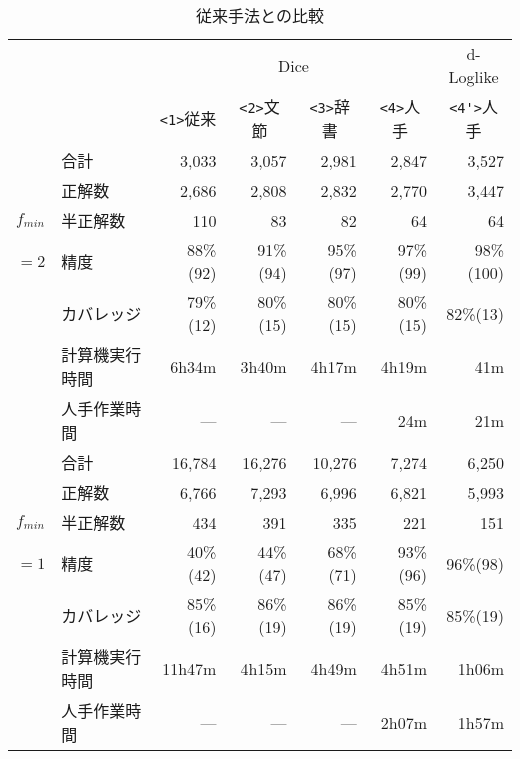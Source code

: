 \begin{table}[t]
\caption{従来手法との比較}
\label{従来手法}
\begin{center}
\begin{tabular}{l|l||r|r|r|r|r}
\hline
\multicolumn{2}{c||}{} 
& \multicolumn{4}{c|}{Dice} 
& \multicolumn{1}{c}{d-Loglike} \\\cline{3-7}
\multicolumn{2}{c||}{} 
& \multicolumn{1}{c|}{\verb|<1>|従来}
& \multicolumn{1}{c|}{\verb|<2>|文節}
& \multicolumn{1}{c|}{\verb|<3>|辞書}
& \multicolumn{1}{c|}{\verb|<4>|人手}
& \multicolumn{1}{c}{\verb|<4'>|人手} \\
\hline
          & 合計    & 3,033   & 3,057   & 2,981   & 2,847   & 3,527\\
          & 正解数  & 2,686   & 2,808   & 2,832   & 2,770   & 3,447\\
$f_{min}$ & 半正解数&   110   &    83   &    82   &    64   &    64\\\cline{2-7}
$=2$      & 精度    & 88\%(92)& 91\%(94)& 95\%(97)& 97\%(99)& 98\%(100) \\
         &カバレッジ& 79\%(12)& 80\%(15)& 80\%(15)& 80\%(15)& 82\%(13)  \\\cline{2-7}
     &計算機実行時間&   6h34m &  3h40m  & 4h17m   & 4h19m   & 41m       \\
       &人手作業時間&     --- &     --- &     --- &   24m   & 21m       \\ \hline

          & 合計    & 16,784  & 16,276  & 10,276  & 7,274   & 6,250     \\
          & 正解数  &  6,766  &  7,293  &  6,996  & 6,821   & 5,993     \\
$f_{min}$ & 半正解数&    434  &    391  &    335  &   221   &   151     \\ \cline{2-7}
$=1$      & 精度    & 40\%(42)& 44\%(47)& 68\%(71)& 93\%(96)&96\%(98)\\
         &カバレッジ& 85\%(16)& 86\%(19)& 86\%(19)& 85\%(19)&85\%(19)\\ \cline{2-7}
     &計算機実行時間&  11h47m & 4h15m   & 4h49m   & 4h51m   & 1h06m  \\
       &人手作業時間&     --- &     --- &     --- & 2h07m   & 1h57m  \\ 
\hline
\end{tabular}
\end{center}
\end{table}

